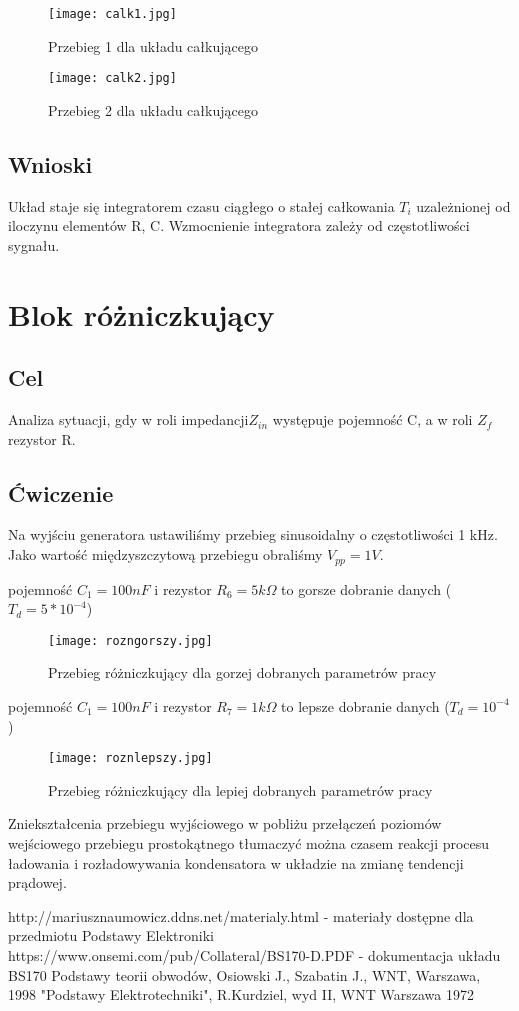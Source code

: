 \documentclass[polish,a4paper]{article}
\begin{document}
\begin{figure}[H]
\centering
\texttt{[image: calk1.jpg]}
\caption{Przebieg 1 dla układu całkującego}
\end{figure}

\begin{figure}[H]
\centering
\texttt{[image: calk2.jpg]}
\caption{Przebieg 2 dla układu całkującego}
\end{figure}

\subsection{Wnioski}
Układ staje się integratorem czasu ciągłego o stałej całkowania
$T_{i}$ uzależnionej od iloczynu elementów R, C.
Wzmocnienie integratora zależy od częstotliwości sygnału.

\section{Blok różniczkujący}
\subsection{Cel}
Analiza sytuacji, gdy w roli impedancji$Z_{in}$ występuje pojemność C, a w roli $Z_{f}$ rezystor R.

\subsection{Ćwiczenie}
Na wyjściu generatora ustawiliśmy przebieg sinusoidalny o częstotliwości 1 kHz. Jako wartość międzyszczytową przebiegu obraliśmy $V_{pp}=1V$.

pojemność $C_{1} = 100nF$ i rezystor $R_{6} = 5k\Omega$ to gorsze dobranie danych ($T_d = 5 * 10^{-4}$)
\begin{figure}[H]
\centering
\texttt{[image: rozngorszy.jpg]}
\caption{Przebieg różniczkujący dla gorzej dobranych parametrów pracy}
\end{figure}
pojemność $C_{1} = 100nF$ i rezystor $R_{7} = 1k\Omega$ to lepsze dobranie danych ($T_d = 10^{-4}$)
\begin{figure}[H]
\centering
\texttt{[image: roznlepszy.jpg]}
\caption{Przebieg różniczkujący dla lepiej dobranych parametrów pracy}
\end{figure}

Zniekształcenia przebiegu wyjściowego w pobliżu przełączeń poziomów wejściowego przebiegu prostokątnego tłumaczyć można czasem reakcji procesu ładowania i rozładowywania kondensatora w układzie na zmianę tendencji prądowej.

\begin{thebibliography}{3}
 http://mariusznaumowicz.ddns.net/materialy.html - materiały dostępne dla przedmiotu Podstawy Elektroniki
 https://www.onsemi.com/pub/Collateral/BS170-D.PDF - dokumentacja układu BS170
Podstawy teorii obwodów, Osiowski J., Szabatin J., WNT, Warszawa, 1998
"Podstawy Elektrotechniki", R.Kurdziel, wyd II, WNT Warszawa 1972
\end{thebibliography}

\newpage
\tableofcontents{}
\end{document}
